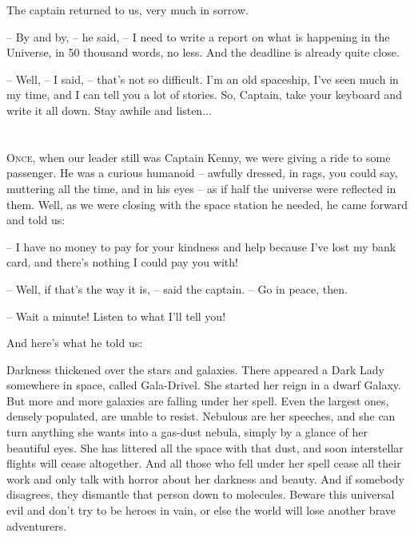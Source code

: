 \documentclass[ebook,oneside,final,openright]{memoir}
\begin{document}
\par
The captain returned to us, very much in sorrow.\par
– By and by, – he said, – I need to write a report on what is happening in the Universe, in 50 thousand words, no less. And the deadline is already quite close.\par
– Well, – I said, – that’s not so difficult. I’m an old spaceship, I’ve seen much in my time, and I can tell you a lot of stories. So, Captain, take your keyboard and write it all down. Stay awhile and listen...
\chapter{}
\par
\lettrine{O}{nce,} when our leader still was Captain Kenny, we were giving a ride to some passenger. He was a curious humanoid – awfully dressed, in rags, you could say, muttering all the time, and in his eyes – as if half the universe were reflected in them. Well, as we were closing with the space station he needed, he came forward and told us: \par
\par
– I have no money to pay for your kindness and help because I’ve lost my bank card, and there’s nothing I could pay you with!\par
– Well, if that’s the way it is, – said the captain. – Go in peace, then. \par
– Wait a minute! Listen to what I’ll tell you! \par
 And here’s what he told us:\par
\par
Darkness thickened over the stars and galaxies. There appeared a Dark Lady somewhere in space, called Gala-Drivel. She started her reign in a dwarf Galaxy. But more and more galaxies are falling under her spell. Even the largest ones, densely populated, are unable to resist. Nebulous are her speeches, and she can turn anything she wants into a gas-dust nebula, simply by a glance of her beautiful eyes. She has littered all the space with that dust, and soon interstellar flights will cease altogether. And all those who fell under her spell cease all their work and only talk with horror about her darkness and beauty. And if somebody disagrees, they dismantle that person down to molecules. Beware this universal evil and don’t try to be heroes in vain, or else the world will lose another brave adventurers.\par
\par
\end{document}
